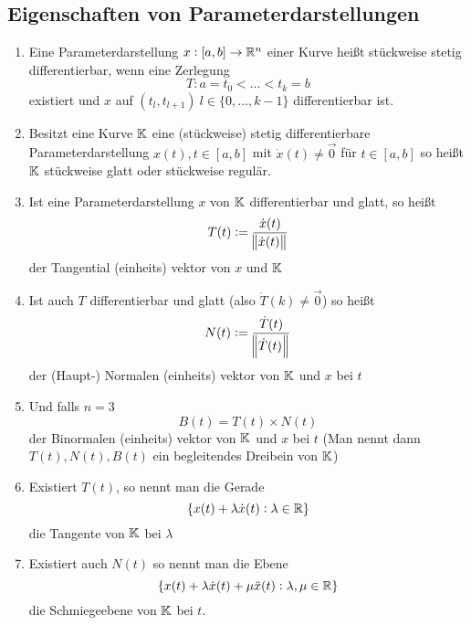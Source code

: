 \subsection{Eigenschaften von Parameterdarstellungen}
\begin{enumerate}[label= (\alph*)]
    \item Eine Parameterdarstellung $x:[a,b] \rightarrow \mathbb{R}^n$ einer Kurve heißt
        stückweise stetig differentierbar, wenn eine Zerlegung
        \begin{equation}
            T: a=t_0 < \ldots < t_k = b
        \end{equation}
        existiert und $x$ auf $(t_l, t_{l+1})\ l\in\{0,\ldots,k-1\}$
        differentierbar ist.
    \item Besitzt eine Kurve $\mathbb{K}$ eine (stückweise) stetig differentierbare
        Parameterdarstellung $x(t), t\in [a,b]$ mit $\dot{x}(t) \neq \vec{0}$
        für $t \in [a,b]$ so heißt $\mathbb{K}$ stückweise glatt oder stückweise regulär.
    \item Ist eine Parameterdarstellung $x$ von $\mathbb{K}$ differentierbar und glatt,
        so heißt
        \begin{equation*}
            T(t) := \frac{\dot{x}(t)}{\norm{\dot{x}(t)}}
        \end{equation*}
        der Tangential (einheits) vektor von $x$ und $\mathbb{K}$
    \item Ist auch $T$ differentierbar und glatt (also $\dot{T}(k) \neq \vec{0}$)
        so heißt
        \begin{equation*}
            N(t) := \frac{\dot{T}(t)}{\norm{\dot{T}(t)}}
        \end{equation*}
        der (Haupt-) Normalen (einheits) vektor von $\mathbb{K}$ und $x$ bei $t$
    \item Und falls $n=3$
        \begin{equation*}
            B(t) = T(t) \times N(t)
        \end{equation*}
        der Binormalen (einheits) vektor von $\mathbb{K}$ und $x$ bei $t$
        (Man nennt dann $T(t), N(t), B(t)$ ein begleitendes Dreibein von $\mathbb{K}$)
    \item Existiert $T(t)$, so nennt man die Gerade
        \begin{equation*}
            \{x(t) + \lambda \dot{x}(t): \lambda \in \mathbb{R}\}
        \end{equation*}
        die Tangente von $\mathbb{K}$ bei $\lambda$
    \item Existiert auch $N(t)$ so nennt man die Ebene
        \begin{equation*}
            \{ x(t) + \lambda \dot{x}(t) + \mu \ddot{x}(t): \lambda, \mu \in \mathbb{R}\}
        \end{equation*}
        die Schmiegeebene von $\mathbb{K}$ bei $t$.
\end{enumerate}

